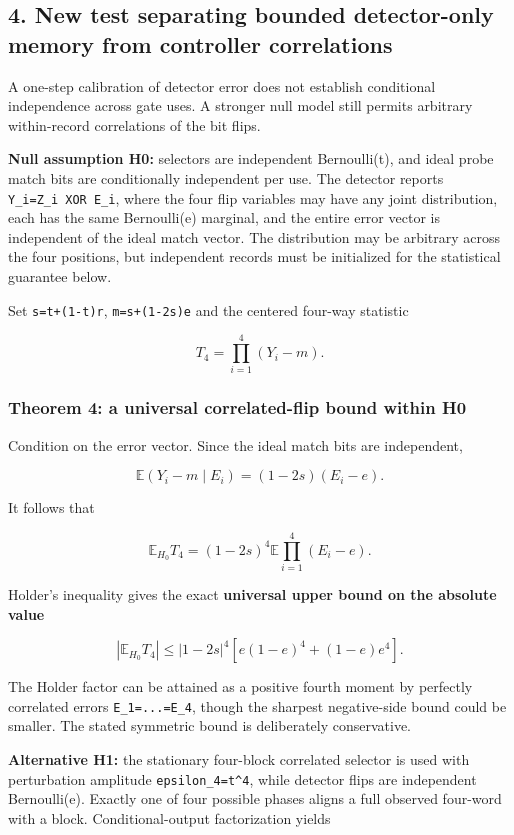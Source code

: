 \documentclass[
  10pt,
  a4paper,
]{article}
\begin{document}
\subsection{4. New test separating bounded detector-only memory from controller correlations}\label{new-test-separating-bounded-detector-only-memory-from-controller-correlations}

A one-step calibration of detector error does not establish conditional independence across gate uses. A stronger null model still permits arbitrary within-record correlations of the bit flips.

\textbf{Null assumption H0:} selectors are independent Bernoulli(t), and ideal probe match bits are conditionally independent per use. The detector reports \texttt{Y\_i=Z\_i\ XOR\ E\_i}, where the four flip variables may have any joint distribution, each has the same Bernoulli(e) marginal, and the entire error vector is independent of the ideal match vector. The distribution may be arbitrary across the four positions, but independent records must be initialized for the statistical guarantee below.

Set \texttt{s=t+(1-t)r}, \texttt{m=s+(1-2s)e} and the centered four-way statistic

\[
T_4=\prod_{i=1}^4 (Y_i-m).
\]

\subsubsection{Theorem 4: a universal correlated-flip bound within H0}\label{theorem-4-a-universal-correlated-flip-bound-within-h0}

Condition on the error vector. Since the ideal match bits are independent,

\[
\mathbb E(Y_i-m\mid E_i)=(1-2s)(E_i-e).
\]

It follows that

\[
\mathbb E_{H_0}T_4=(1-2s)^4\mathbb E\prod_{i=1}^4(E_i-e).
\]

Holder's inequality gives the exact \textbf{universal upper bound on the absolute value}

\[
\boxed{\left|\mathbb E_{H_0}T_4\right|
\le |1-2s|^4\left[e(1-e)^4+(1-e)e^4\right].}
\]

The Holder factor can be attained as a positive fourth moment by perfectly correlated errors \texttt{E\_1=...=E\_4}, though the sharpest negative-side bound could be smaller. The stated symmetric bound is deliberately conservative.

\textbf{Alternative H1:} the stationary four-block correlated selector is used with perturbation amplitude \texttt{epsilon\_4=t\^{}4}, while detector flips are independent Bernoulli(e). Exactly one of four possible phases aligns a full observed four-word with a block. Conditional-output factorization yields
\end{document}
